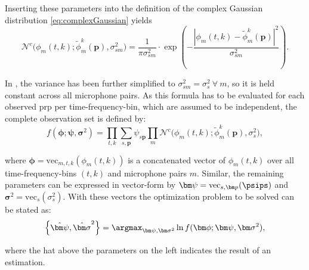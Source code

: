 Inserting these parameters into the definition of the complex Gaussian distribution \eqref{eq:complexGaussian} yields
\begin{equation}
    \mathcal{N}^c\big(\phi_m(t,k);\tilde\phi_m^k(\bm p),\sigma_{sm}^2\big)=\frac{1}{\pi\sigma_{sm}^2}\cdot\exp\left (-\frac{\left|\phi_m(t,k)-\tilde\phi_m^k(\bm p)\right|^2}{\sigma_{sm}^2} \right ).
\label{eq:gaussian}
\end{equation}

In \cite{Schwartz2014}, the variance has been further simplified to $\sigma_{sm}^2=\sigma_s^2\ \forall\ m$, so it is held constant across all microphone pairs. As this formula has to be evaluated for each observed \gls{prp} per time-frequency-bin, which are assumed to be independent, the complete observation set is defined by:
\begin{equation}
    f(\bm\phi;\bm\psi,\bm\sigma^2)=\prod_{t,k}\sum_{s,\bm p}\psi_{s\bm p}\prod_m\mathcal{N}^c\big(\phi_m(t,k);\tilde\phi^k_m(\bm p),\sigma^2_{s}\big),
\end{equation}

where $\bm\phi=\text{vec}_{m,t,k}(\phi_m(t,k))$ is a concatenated vector of $\phi_m(t,k)$ over all time-frequency-bins $(t,k)$ and microphone pairs $m$. Similar, the remaining parameters can be expressed in vector-form by $\bm\psi=\text{vec}_{s,\bm p}(\psips)$ and $\bm\sigma^2=\text{vec}_{s}(\sigma_s^2)$. With these vectors the optimization problem to be solved can be stated as:
\begin{equation}
    \left\{\hat{\bm\psi},\hat{\bm\sigma}^2\right\}=\argmax_{\bm\psi, \bm\sigma^2}\ln f(\bm\phi;\bm\psi,\bm\sigma^2),
\label{eq:mle}
\end{equation}

where the hat above the parameters on the left indicates the result of an estimation.

